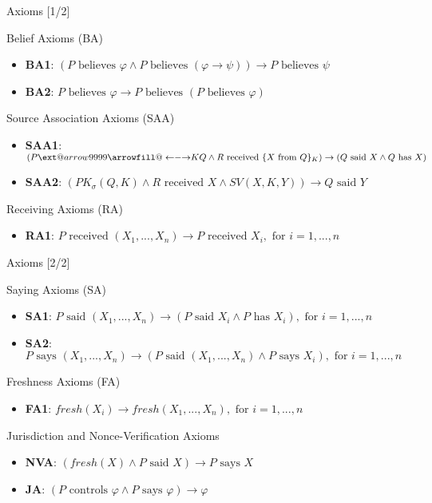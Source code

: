 \documentclass[10pt]{beamer}
\makeatletter
\newcommand\xleftrightarrow[2][]{%
  \ext@arrow 9999{\longleftrightarrowfill@}{#1}{#2}}
\newcommand\longleftrightarrowfill@{%
  \arrowfill@\leftarrow\relbar\rightarrow}
\newcommand{\xtext}[1]{\text{ #1 }}
\makeatother
\begin{document}
\begin{frame}{Axioms [1/2]}
	\begin{block}{Belief Axioms (BA)}
		\begin{itemize}
			\item \textbf{BA1}: $(P \xtext{believes} \varphi \land P \xtext{believes}(\varphi \rightarrow \psi))\rightarrow P \xtext{believes} \psi$
			\item \textbf{BA2}: $P \xtext{believes} \varphi \rightarrow P \xtext{believes} (P \xtext{believes} \varphi)$
		\end{itemize}
	\end{block}
	\begin{block}{Source Association Axioms (SAA)}
		\begin{itemize}
			\item \textbf{SAA1}: $(P \xleftrightarrow{K} Q \land R \xtext{received} \{X \xtext{from} Q\}_K) \rightarrow (Q \xtext{said} X \land Q \xtext{has} X)$
			\item \textbf{SAA2}: $(PK_\sigma(Q,K) \land R \xtext{received} X \land SV(X,K,Y)) \rightarrow Q \xtext{said} Y$
		\end{itemize}
	\end{block}
	\begin{block}{Receiving Axioms (RA)}
		\begin{itemize}
			\item \textbf{RA1}: $P \xtext{received} (X_1, ..., X_n) \rightarrow P \xtext{received} X_i, \xtext{for} i=1,...,n$
		\end{itemize}
	\end{block}
\end{frame}
\begin{frame}{Axioms [2/2]}
	\begin{block}{Saying Axioms (SA)}
		\begin{itemize}
			\item \textbf{SA1}: $P \xtext{said} (X_1, ..., X_n) \rightarrow (P \xtext{said} X_i \land P \xtext{has}X_i),\xtext{for} i=1,...,n$
			\item \textbf{SA2}: $P \xtext{says} (X_1, ..., X_n) \rightarrow (P \xtext{said} (X_1, ..., X_n) \land P \xtext{says}X_i),\xtext{for} i=1,...,n$
		\end{itemize}
	\end{block}
	\begin{block}{Freshness Axioms (FA)}
		\begin{itemize}
			\item \textbf{FA1}: $fresh(X_i) \rightarrow fresh(X_1, ..., X_n),\xtext{for} i=1,...,n$
		\end{itemize}
	\end{block}
	\begin{block}{Jurisdiction and Nonce-Verification Axioms}
		\begin{itemize}
			\item \textbf{NVA}: $(fresh(X) \land P \xtext{said} X) \rightarrow P \xtext{says} X$
			\item \textbf{JA}: $(P \xtext{controls} \varphi \land P \xtext{says} \varphi) \rightarrow \varphi$
		\end{itemize}
	\end{block}
\end{frame}
\end{document}
